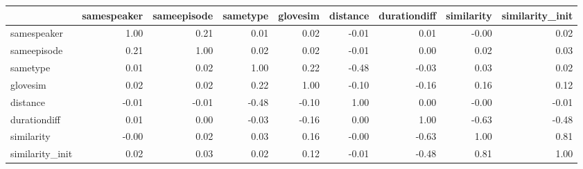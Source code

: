 \begin{tabular}{lrrrrrrrr}
\toprule
{} &  samespeaker &  sameepisode &  sametype &  glovesim &  distance &  durationdiff &  similarity &  similarity\_init \\
\midrule
samespeaker     &         1.00 &         0.21 &      0.01 &      0.02 &     -0.01 &          0.01 &       -0.00 &             0.02 \\
sameepisode     &         0.21 &         1.00 &      0.02 &      0.02 &     -0.01 &          0.00 &        0.02 &             0.03 \\
sametype        &         0.01 &         0.02 &      1.00 &      0.22 &     -0.48 &         -0.03 &        0.03 &             0.02 \\
glovesim        &         0.02 &         0.02 &      0.22 &      1.00 &     -0.10 &         -0.16 &        0.16 &             0.12 \\
distance        &        -0.01 &        -0.01 &     -0.48 &     -0.10 &      1.00 &          0.00 &       -0.00 &            -0.01 \\
durationdiff    &         0.01 &         0.00 &     -0.03 &     -0.16 &      0.00 &          1.00 &       -0.63 &            -0.48 \\
similarity      &        -0.00 &         0.02 &      0.03 &      0.16 &     -0.00 &         -0.63 &        1.00 &             0.81 \\
similarity\_init &         0.02 &         0.03 &      0.02 &      0.12 &     -0.01 &         -0.48 &        0.81 &             1.00 \\
\bottomrule
\end{tabular}
